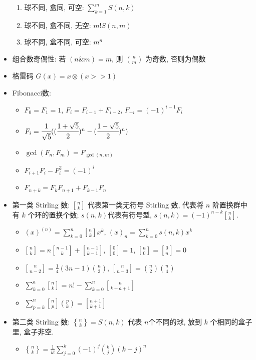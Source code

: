 \documentclass[landscape, twocolumn, 8pt, a4paper, twoside]{extarticle}
\newcommand{\stlf}[2]{\genfrac{ [ }{ ] }{0pt}{}{#1}{#2}}
\newcommand{\stls}[2]{\genfrac{ \{ }{ \} }{0pt}{}{#1}{#2}}
\begin{document}
\begin{spacing}{0.1}
\begin{itemize}
\begin{enumerate}
  \item 球不同, 盒同, 可空: $\sum_{k = 1}^{m} S(n, k)$
  \item 球不同, 盒不同, 无空: $m! S(n, m)$
  \item 球不同, 盒不同, 可空: $m^n$
  \end{enumerate}
\item 组合数奇偶性: 若 $(n \& m) = m$, 则 $\binom{n}{m}$ 为奇数, 否则为偶数
\item 格雷码 $G(x) = x \otimes (x >> 1) $
\item Fibonacci数: 
  \begin{itemize}
  \item $F_0 = F_1 = 1$, $F_i = F_{i - 1} + F_{i - 2}$, $F_{-i} = (-1) ^ {i - 1} F_i$
  \item $F_i = \cfrac{1}{\sqrt{5}} ((\cfrac{1 + \sqrt{5}}{2}) ^ n - (\cfrac{1 - \sqrt{5}}{2}) ^ {n}) $
  \item $\gcd(F_n,F_m)=F_{\gcd(n,m)}$
  \item $F_{i + 1} F_i - F_i^2 = (-1) ^ i$
  \item $F_{n + k} = F_k F_{n + 1} + F_{k - 1} F_n$
  \end{itemize}
\item 第一类 Stirling 数: $\stlf{n}{k}$ 代表第一类无符号 Stirling 数, 代表将 $n$ 阶置换群中有 $k$ 个环的置换个数; $s(n,k)$代表有符号型, $s(n, k) = (-1)^{n - k}\stlf{n}{k}$.
  \begin{itemize}
  \item $(x)^{(n)} = \sum\limits_{k = 0}^{n}\stlf{n}{k}x ^k$, $(x)_{n} = \sum\limits_{k = 0}^{n} s(n, k) x ^k$
  \item $\stlf{n}{k} = n\stlf{n - 1}{k} + \stlf{n - 1}{k - 1}$, $\stlf{0}{0} = 1$, $\stlf{n}{0} = \stlf{0}{n} = 0$
  \item $\stlf{n}{n - 2} = \frac{1}{4} (3n - 1) \binom{n}{3} $, $\stlf{n}{n - 3} = \binom{n}{2} \binom{n}{4} $
  \item $\sum\limits_{k = 0}^{a}\stlf{n}{k} = n! - \sum\limits_{k = 0}^{n} \stlf{n}{k + a + 1}$
  \item $\sum\limits_{p = k}^{n}\stlf{n}{p}\binom{p}{k} = \stlf{n + 1}{k + 1}$
  \end{itemize}
\item 第二类 Stirling 数: $\stls{n}{k} = S(n, k)$ 代表 $n$个不同的球, 放到 $k$ 个相同的盒子里, 盒子非空.
  \begin{itemize}
  \item $\stls{n}{k} = \frac{1}{k!} \sum\limits_{j = 0}^{k} (-1)^j \binom{k}{j} (k - j)^n$

\end{itemize}
\end{itemize}
\end{spacing}
\end{document}

